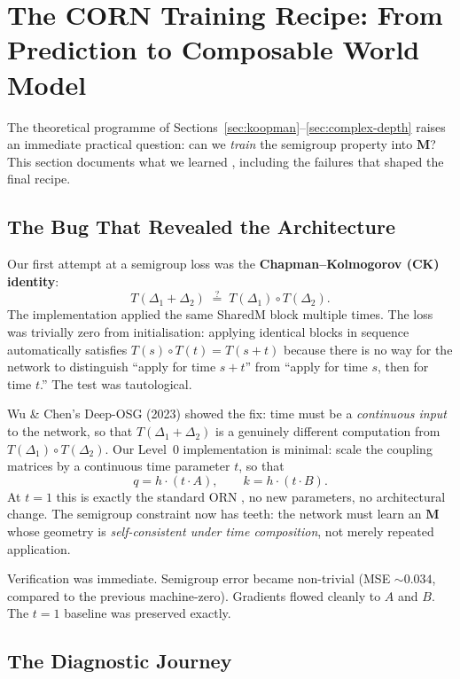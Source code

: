 \documentclass[11pt, a4paper]{article}
\newcommand{\M}{\mathbf{M}}
\theoremstyle{plain}
\theoremstyle{remark}
\begin{document}
\section{The CORN Training Recipe: From Prediction to Composable World Model}\label{sec:corn}

The theoretical programme of Sections~\ref{sec:koopman}--\ref{sec:complex-depth} raises an immediate practical question: can we \emph{train} the semigroup property into $\M$?
This section documents what we learned ,  including the failures that shaped the final recipe.

\subsection{The Bug That Revealed the Architecture}

Our first attempt at a semigroup loss was the \textbf{Chapman--Kolmogorov (CK) identity}:
\[
  T(\Delta_1 + \Delta_2) \;\stackrel{?}{=}\; T(\Delta_1) \circ T(\Delta_2).
\]
The implementation applied the same SharedM block multiple times.
The loss was trivially zero from initialisation: applying identical blocks in sequence automatically satisfies $T(s) \circ T(t) = T(s+t)$ because there is no way for the network to distinguish ``apply for time $s+t$'' from ``apply for time $s$, then for time $t$.''
The test was tautological.

Wu \& Chen's Deep-OSG (2023) showed the fix: time must be a \emph{continuous input} to the network, so that $T(\Delta_1 + \Delta_2)$ is a genuinely different computation from $T(\Delta_1) \circ T(\Delta_2)$.
Our Level~0 implementation is minimal: scale the coupling matrices by a continuous time parameter $t$, so that
\[
  q = h \cdot (t \cdot A), \qquad k = h \cdot (t \cdot B).
\]
At $t = 1$ this is exactly the standard ORN ,  no new parameters, no architectural change.
The semigroup constraint now has teeth: the network must learn an $\M$ whose geometry is \emph{self-consistent under time composition}, not merely repeated application.

Verification was immediate.
Semigroup error became non-trivial (MSE $\sim 0.034$, compared to the previous machine-zero).
Gradients flowed cleanly to $A$ and $B$.
The $t = 1$ baseline was preserved exactly.

\subsection{The Diagnostic Journey}
\end{document}
